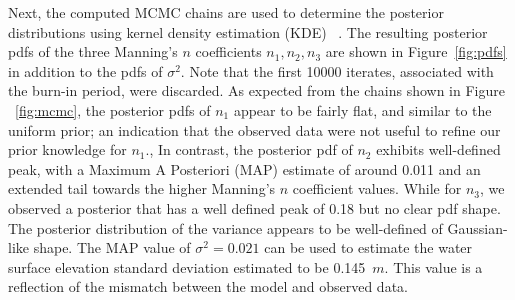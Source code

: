 Next, the computed MCMC chains are used to determine the posterior 
distributions using kernel density estimation (KDE)
~\citep{Parzen1962,Silverman1986}.  The resulting posterior pdfs 
of the three Manning's $n$ coefficients $n_1,n_2,n_3$ are shown 
in Figure~\ref{fig:pdfs} in addition to the pdfs of $\sigma^2$. 
Note that the first 10000 iterates, associated with the burn-in period, were discarded.  
As expected from the chains shown in Figure
~\ref{fig:mcmc}, the posterior pdfs of $n_1$ appear to be fairly flat, 
and similar to the uniform prior; an indication that 
the observed data were not useful to refine our prior knowledge for $n_1$.,
In contrast, the posterior pdf of $n_2$ exhibits well-defined peak, 
with a Maximum A Posteriori (MAP) estimate of around 0.011
and an extended tail towards the higher Manning's $n$ coefficient values.
While for $n_3$, we observed a posterior that has a well defined peak
of 0.18 but no clear pdf shape. The posterior distribution of the variance 
appears to be well-defined of Gaussian-like shape. 
The MAP value of $\sigma^2=0.021$ can be used to estimate the water surface elevation standard 
deviation estimated to be 0.145~$m$. 
This value is a reflection of the mismatch between the model and 
observed data.





